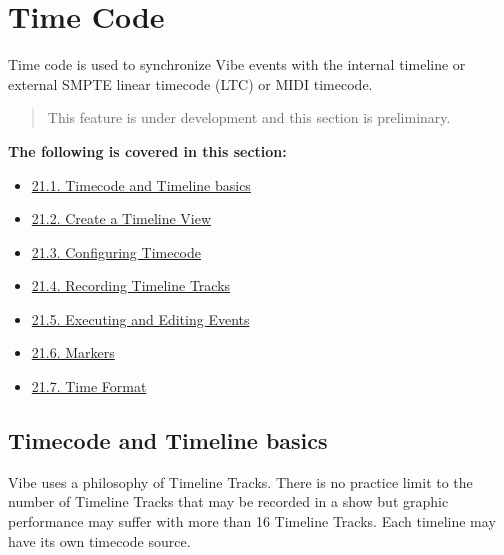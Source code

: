 \documentclass[
]{article}
\begin{document}
\hypertarget{time-code}{%
\section{Time Code}\label{time-code}}

Time code is used to synchronize Vibe events with the internal timeline or external SMPTE linear timecode (LTC) or MIDI timecode.

\begin{quote}
{This feature is under development and this section is preliminary.}
\end{quote}

\textbf{The following is covered in this section:}

\begin{itemize}
\item
  \href{https://vibemanual.compulite.com/working-with-time-code.html\#timecode-and-timeline-basics}{21.1. Timecode and Timeline basics}
\item
  \href{https://vibemanual.compulite.com/working-with-time-code.html\#create-a-timeline-view}{21.2. Create a Timeline View}
\item
  \href{https://vibemanual.compulite.com/working-with-time-code.html\#configuring-timecode}{21.3. Configuring Timecode}
\item
  \href{https://vibemanual.compulite.com/working-with-time-code.html\#recording-timeline-tracks}{21.4. Recording Timeline Tracks}
\item
  \href{https://vibemanual.compulite.com/working-with-time-code.html\#executing-and-editing-events}{21.5. Executing and Editing Events}
\item
  \href{https://vibemanual.compulite.com/working-with-time-code.html\#markers}{21.6. Markers}
\item
  \href{https://vibemanual.compulite.com/time-code.html\#time-format}{21.7. Time Format}
\end{itemize}

\hypertarget{timecode-and-timeline-basics}{%
\subsection{Timecode and Timeline basics}\label{timecode-and-timeline-basics}}

Vibe uses a philosophy of Timeline Tracks. There is no practice limit to the number of Timeline Tracks that may be recorded in a show but graphic performance may suffer with more than 16 Timeline Tracks. Each timeline may have its own timecode source.
\end{document}
